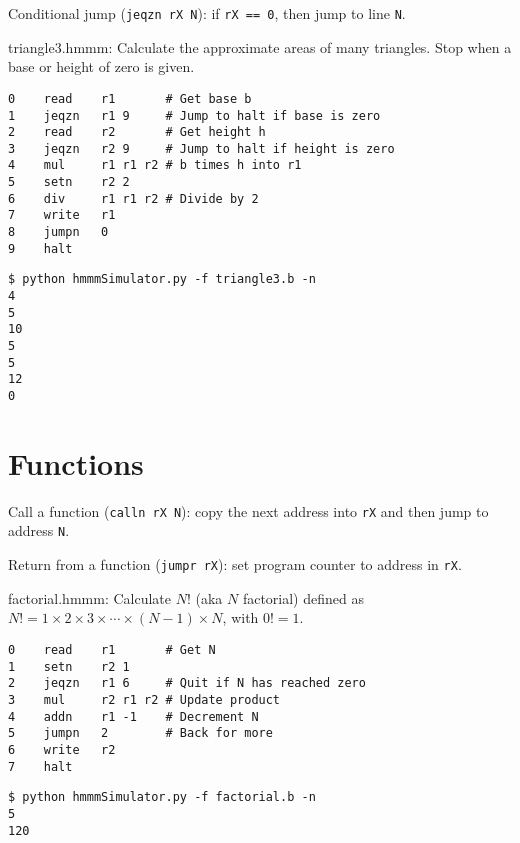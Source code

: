 \documentclass[8pt,a4paper,compress,handout]{beamer}
\begin{document}
\begin{frame}[fragile]
Conditional jump (\lstinline{jeqzn rX N}): if \lstinline{rX == 0}, then jump to line \lstinline{N}.

\bigskip

\begin{framed}
\tiny triangle3.hmmm: Calculate the approximate areas of many triangles. Stop when a base or height of zero is given.
\end{framed}

\begin{lstlisting}[language={}]
0    read    r1       # Get base b
1    jeqzn   r1 9     # Jump to halt if base is zero
2    read    r2       # Get height h
3    jeqzn   r2 9     # Jump to halt if height is zero
4    mul     r1 r1 r2 # b times h into r1
5    setn    r2 2
6    div     r1 r1 r2 # Divide by 2
7    write   r1
8    jumpn   0
9    halt
\end{lstlisting}

\begin{lstlisting}[language={}]
$ python hmmmSimulator.py -f triangle3.b -n
4
5
10
5
5
12
0
\end{lstlisting}
\end{frame}

\section{Functions}

\begin{frame}[fragile]

Call a function (\lstinline{calln rX N}): copy the next address into \lstinline$rX$ and then jump to address \lstinline{N}.

\bigskip

Return from a function (\lstinline{jumpr rX}): set program counter to address in \lstinline{rX}.

\bigskip

\begin{framed}
\tiny factorial.hmmm: Calculate $N!$ (aka $N$ factorial) defined as $N!=1 \times 2 \times 3 \times \cdots \times (N-1) \times N$, with $0!=1$.
\end{framed}

\begin{lstlisting}[language={},mathescape]
0    read    r1       # Get N
1    setn    r2 1
2    jeqzn   r1 6     # Quit if N has reached zero
3    mul     r2 r1 r2 # Update product
4    addn    r1 -1    # Decrement N
5    jumpn   2        # Back for more
6    write   r2
7    halt
\end{lstlisting}

\begin{lstlisting}[language={}]
$ python hmmmSimulator.py -f factorial.b -n
5
120
\end{lstlisting}
\end{frame}
\end{document}
